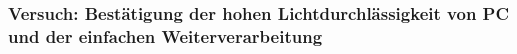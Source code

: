 \subsubsection{Versuch: Bestätigung der hohen Lichtdurchlässigkeit von PC und der einfachen
Weiterverarbeitung}
